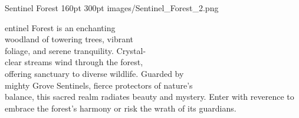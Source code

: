 \documentclass[letterpaper,openany,twoside,twocolumn]{book}
\begin{document}
\MonsterBannerGraphic%
	{Sentinel Forest}%
	{160pt}%
	{300pt}%
	{images/Sentinel_Forest_2.png}%
	{}%

entinel Forest is an enchanting\\woodland of towering trees, vibrant\\foliage, and serene tranquility. Crystal-\\clear streams wind through the forest,\\offering sanctuary to diverse wildlife. Guarded by\\mighty Grove Sentinels, fierce protectors of nature's\\balance, this sacred realm radiates beauty and mystery. Enter with reverence to embrace the forest's harmony or risk the wrath of its guardians.
\end{document}
